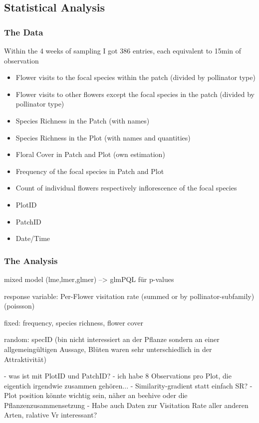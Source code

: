 \subsection{Statistical Analysis}

\subsubsection{The Data}

Within the 4 weeks of sampling I got 386 entries, each equivalent to 15min of observation

\begin{itemize}
\item Flower visits to the focal species within the patch (divided by pollinator type)
\item Flower visits to other flowers except the focal species in the patch (divided by pollinator type)
\item Species Richness in the Patch (with names)
\item Species Richness in the Plot (with names and quantities)
\item Floral Cover in Patch and Plot (own estimation)
\item Frequency of the focal species in Patch and Plot
\item Count of individual flowers respectively inflorescence of the focal species
\item PlotID
\item PatchID
\item Date/Time
\end{itemize}

\subsubsection{The Analysis}


mixed model (lme,lmer,glmer) --> glmPQL für p-values

response variable: Per-Flower visitation rate (summed or by pollinator-subfamily) (poissson)

fixed: frequency, species richness, flower cover

random: specID (bin nicht interessiert an der Pflanze sondern an einer allgemeingültigen Aussage, Blüten waren sehr unterschiedlich in der Attraktivität)

- was ist mit PlotID und PatchID?
- ich habe 8 Observations pro Plot, die eigentich irgendwie zusammen gehören...
- Similarity-gradient statt einfach SR?
- Plot position könnte wichtig sein, näher an beehive oder die Pflanzenzusammensetzung
- Habe auch Daten zur Visitation Rate aller anderen Arten, ralative Vr interessant?


